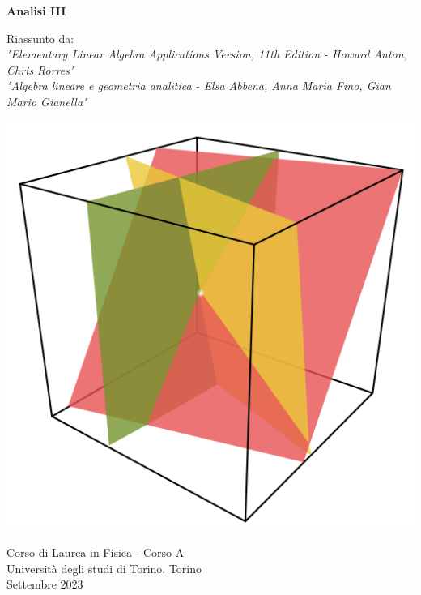 \begin{titlepage}
	\begin{center}
		\vspace*{1cm}
		
		
		
		
		\textbf{\Huge Analisi III}
		
		\vspace{0.8cm}
		Riassunto da: \\ 
		
		\textit{"Elementary Linear Algebra Applications Version, 11th Edition - Howard Anton, Chris Rorres"} \\
		
		\textit{"Algebra lineare e geometria analitica - Elsa Abbena, Anna Maria Fino, Gian Mario Gianella"}
		
		
		
		
		\vfill
		\begin{center}
			\includegraphics[scale =0.17]{pngegg.png}
		\end{center}
		
		
		\vfill
		\vspace{0.8cm}
		
		
		Corso di Laurea in Fisica - Corso A\\
		Università degli studi di Torino, Torino\\
		Settembre 2023\\
		
		
	\end{center}
\end{titlepage}
